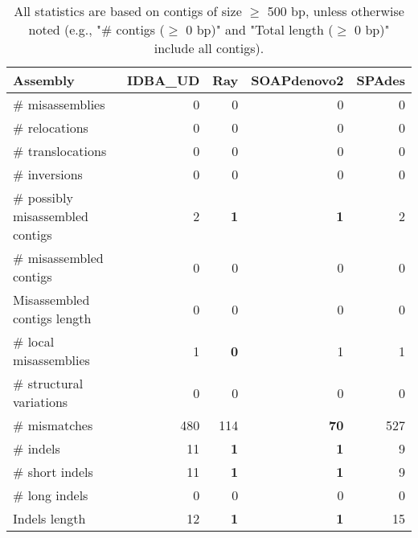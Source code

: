 \documentclass[12pt,a4paper]{article}
\begin{document}
\begin{table}[ht]
\begin{center}
\caption{All statistics are based on contigs of size $\geq$ 500 bp, unless otherwise noted (e.g., "\# contigs ($\geq$ 0 bp)" and "Total length ($\geq$ 0 bp)" include all contigs).}
\begin{tabular}{|l*{4}{|r}|}
\hline
Assembly & IDBA\_UD & Ray & SOAPdenovo2 & SPAdes \\ \hline
\# misassemblies & 0 & 0 & 0 & 0 \\ \hline
\hspace{5mm}\# relocations & 0 & 0 & 0 & 0 \\ \hline
\hspace{5mm}\# translocations & 0 & 0 & 0 & 0 \\ \hline
\hspace{5mm}\# inversions & 0 & 0 & 0 & 0 \\ \hline
\# possibly misassembled contigs & 2 & {\bf 1} & {\bf 1} & 2 \\ \hline
\# misassembled contigs & 0 & 0 & 0 & 0 \\ \hline
Misassembled contigs length & 0 & 0 & 0 & 0 \\ \hline
\# local misassemblies & 1 & {\bf 0} & 1 & 1 \\ \hline
\# structural variations & 0 & 0 & 0 & 0 \\ \hline
\# mismatches & 480 & 114 & {\bf 70} & 527 \\ \hline
\# indels & 11 & {\bf 1} & {\bf 1} & 9 \\ \hline
\hspace{5mm}\# short indels & 11 & {\bf 1} & {\bf 1} & 9 \\ \hline
\hspace{5mm}\# long indels & 0 & 0 & 0 & 0 \\ \hline
Indels length & 12 & {\bf 1} & {\bf 1} & 15 \\ \hline
\end{tabular}
\end{center}
\end{table}
\end{document}
